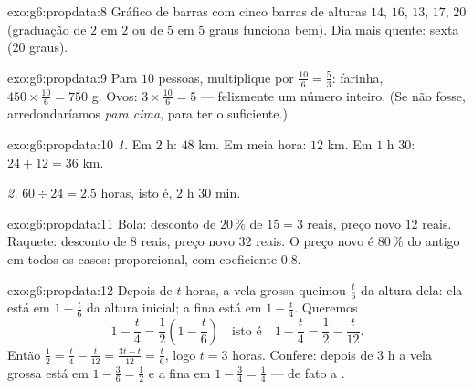 \begin{solution}{exo:g6:propdata:8}
Gráfico de barras com cinco barras de alturas $14$, $16$, $13$, $17$,
$20$ (graduação de $2$ em $2$ ou de $5$ em $5$ graus funciona bem). Dia
mais quente: sexta ($20$ graus).
\end{solution}

\begin{solution}{exo:g6:propdata:9}
Para $10$ pessoas, multiplique por $\frac{10}{6} = \frac53$: farinha,
$450 \times \frac{10}{6} = 750$ g. Ovos:
$3 \times \frac{10}{6} = 5$ --- felizmente um número inteiro. (Se não
fosse, arredondaríamos \emph{para cima}, para ter o suficiente.)
\end{solution}

\begin{solution}{exo:g6:propdata:10}
\emph{1.} Em $2$ h: $48$ km. Em meia hora: $12$ km. Em $1$ h $30$:
$24 + 12 = 36$ km.

\emph{2.} $60 \div 24 = 2.5$ horas, isto é, $2$ h $30$ min.
\end{solution}

\begin{solution}{exo:g6:propdata:11}
Bola: desconto de $20\,\%$ de $15 = 3$ reais, preço novo $12$ reais.
Raquete: desconto de $8$ reais, preço novo $32$ reais. O preço novo é
$80\,\%$ do antigo em todos os casos: proporcional, com coeficiente
$0.8$.
\end{solution}

\begin{solution}{exo:g6:propdata:12}
Depois de $t$ horas, a vela grossa queimou $\frac t6$ da altura dela:
ela está em $1 - \frac t6$ da altura inicial; a fina está em
$1 - \frac t4$. Queremos
\[
1 - \frac t4 = \frac12 \left(1 - \frac t6\right)
\quad\text{isto é}\quad
1 - \frac t4 = \frac12 - \frac t{12}.
\]
Então $\frac12 = \frac t4 - \frac t{12} = \frac{3t - t}{12} =
\frac{t}{6}$, logo $t = 3$ horas. Confere: depois de $3$ h a vela
grossa está em $1 - \frac36 = \frac12$ e a fina em
$1 - \frac34 = \frac14$ --- de fato a .
\end{solution}

